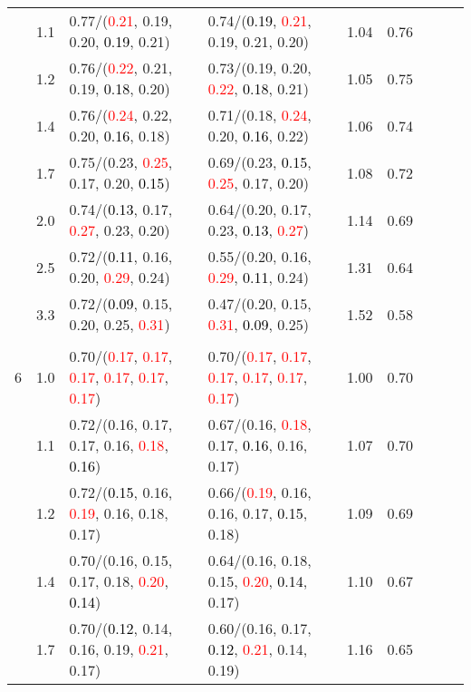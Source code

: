 \documentclass[10pt,a4paper]{report}
\begin{document}
\begin{table}[!htbp]
\begin{center}
{\begin{tabular}{ccllccccc}
			&1.1&0.77/(\textcolor{red}{0.21}, 0.19, 0.20, \textcolor{black}{0.19}, 0.21)&0.74/(\textcolor{black}{0.19}, \textcolor{red}{0.21}, 0.19, 0.21, 0.20)&1.04&0.76\\
			&1.2&0.76/(\textcolor{red}{0.22}, 0.21, 0.19, \textcolor{black}{0.18}, 0.20)&0.73/(0.19, 0.20, \textcolor{red}{0.22}, \textcolor{black}{0.18}, 0.21)&1.05&0.75\\
			&1.4&0.76/(\textcolor{red}{0.24}, 0.22, 0.20, \textcolor{black}{0.16}, 0.18)&0.71/(0.18, \textcolor{red}{0.24}, 0.20, \textcolor{black}{0.16}, 0.22)&1.06&0.74\\
			&1.7&0.75/(0.23, \textcolor{red}{0.25}, 0.17, 0.20, \textcolor{black}{0.15})&0.69/(0.23, \textcolor{black}{0.15}, \textcolor{red}{0.25}, 0.17, 0.20)&1.08&0.72\\
			&2.0&0.74/(\textcolor{black}{0.13}, 0.17, \textcolor{red}{0.27}, 0.23, 0.20)&0.64/(0.20, 0.17, 0.23, \textcolor{black}{0.13}, \textcolor{red}{0.27})&1.14&0.69\\
			&2.5&0.72/(\textcolor{black}{0.11}, 0.16, 0.20, \textcolor{red}{0.29}, 0.24)&0.55/(0.20, 0.16, \textcolor{red}{0.29}, \textcolor{black}{0.11}, 0.24)&1.31&0.64\\
			&3.3&0.72/(\textcolor{black}{0.09}, 0.15, 0.20, 0.25, \textcolor{red}{0.31})&0.47/(0.20, 0.15, \textcolor{red}{0.31}, \textcolor{black}{0.09}, 0.25)&1.52&0.58\\
			&&&&\\
			6			&1.0&0.70/(\textcolor{red}{0.17}, \textcolor{red}{0.17}, \textcolor{red}{0.17}, \textcolor{red}{0.17}, \textcolor{red}{0.17}, \textcolor{red}{0.17})&0.70/(\textcolor{red}{0.17}, \textcolor{red}{0.17}, \textcolor{red}{0.17}, \textcolor{red}{0.17}, \textcolor{red}{0.17}, \textcolor{red}{0.17})&1.00&0.70\\
			&1.1&0.72/(0.16, 0.17, 0.17, 0.16, \textcolor{red}{0.18}, \textcolor{black}{0.16})&0.67/(0.16, \textcolor{red}{0.18}, 0.17, \textcolor{black}{0.16}, 0.16, 0.17)&1.07&0.70\\
			&1.2&0.72/(\textcolor{black}{0.15}, 0.16, \textcolor{red}{0.19}, 0.16, 0.18, 0.17)&0.66/(\textcolor{red}{0.19}, 0.16, 0.16, 0.17, \textcolor{black}{0.15}, 0.18)&1.09&0.69\\
			&1.4&0.70/(0.16, 0.15, 0.17, 0.18, \textcolor{red}{0.20}, \textcolor{black}{0.14})&0.64/(0.16, 0.18, 0.15, \textcolor{red}{0.20}, \textcolor{black}{0.14}, 0.17)&1.10&0.67\\
			&1.7&0.70/(\textcolor{black}{0.12}, 0.14, 0.16, 0.19, \textcolor{red}{0.21}, 0.17)&0.60/(0.16, 0.17, \textcolor{black}{0.12}, \textcolor{red}{0.21}, 0.14, 0.19)&1.16&0.65\\

\end{tabular}}
\end{center}
\end{table}
\end{document}
